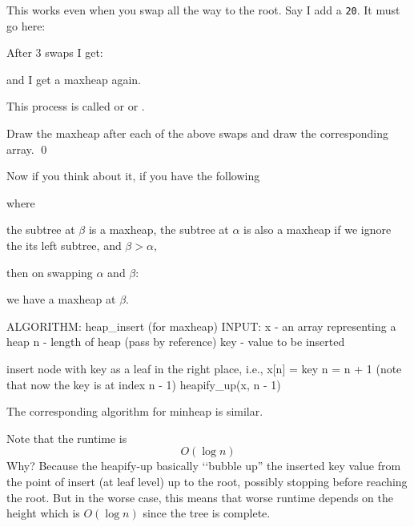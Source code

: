 This works even when you swap all the way to the root.
Say I add a \verb!20!.
It must go here:



After 3 swaps I get:



and I get a maxheap again.

This process is called
or
or
.

\begin{ex}
Draw the maxheap after each
of the above swaps and draw the corresponding array.
\qed
\end{ex}
  
Now if you think about it,
if you have the following


where 
\begin{tightlist}
\li the subtree at $\beta$ is a maxheap,
\li the subtree at $\alpha$ is also a maxheap if we ignore the 
its left subtree, 
\li and $\beta > \alpha$, 
\end{tightlist}
then
on swapping $\alpha$ and $\beta$:


we have a maxheap at $\beta$.

\begin{console}[commandchars=\\\{\}]
ALGORITHM: heap_insert (for maxheap)
INPUT: x - an array representing a heap
       n - length of heap (pass by reference)
       key - value to be inserted

insert node with key as a leaf in the right place, i.e.,
x[n] = key
n = n + 1 (note that now the key is at index n - 1)
heapify_up(x, n - 1)
\end{console}

The corresponding algorithm for minheap is similar.

Note that the runtime is
\[
O(\log n)
\]
Why?
Because the heapify-up basically \lq\lq bubble up''
the inserted key value from the point of insert (at leaf level)
up to the root,
possibly stopping before reaching the root.
But in the worse case, this means that
worse runtime depends on the height which is $O(\log n)$
since the tree is complete.





